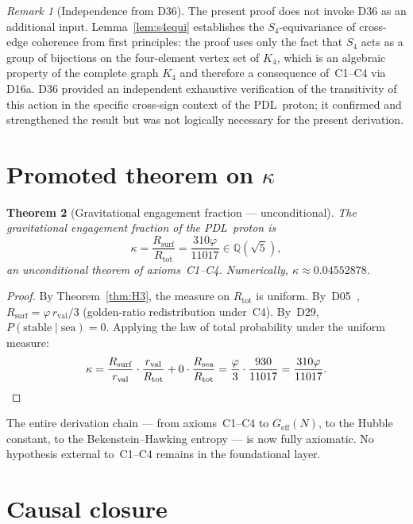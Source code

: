 \documentclass[11pt,a4paper]{article}
\theoremstyle{plain}
\newtheorem{theorem}{Theorem}[section]
\theoremstyle{definition}
\theoremstyle{remark}
\newtheorem{remark}[theorem]{Remark}
\newcommand{\PDL}{\textnormal{PDL}}
\newcommand{\Kfour}{K_4}
\newcommand{\Rtot}{R_{\mathrm{tot}}}
\newcommand{\Rsurf}{R_{\mathrm{surf}}}
\newcommand{\Rsea}{R_{\mathrm{sea}}}
\newcommand{\rval}{r_{\mathrm{val}}}
\newcommand{\vp}{\varphi}
\newcommand{\kap}{\kappa}
\begin{document}
\begin{remark}[Independence from D36]
The present proof does not invoke D36 as an additional input. Lemma~\ref{lem:s4equi} establishes the $S_4$-equivariance of cross-edge coherence from first principles: the proof uses only the fact that $S_4$ acts as a group of bijections on the four-element vertex set of $\Kfour$, which is an algebraic property of the complete graph $K_4$ and therefore a consequence of~C1--C4 via D16a. D36 provided an independent exhaustive verification of the transitivity of this action in the specific cross-sign context of the \PDL\ proton; it confirmed and strengthened the result but was not logically necessary for the present derivation.
\end{remark}

\section{Promoted theorem on \texorpdfstring{$\kap$}{kappa}}
\label{sec:kappa}

\begin{theorem}[Gravitational engagement fraction --- unconditional]
\label{thm:kappa}
The gravitational engagement fraction of the \PDL\ proton is
\[
\kap = \frac{\Rsurf}{\Rtot} = \frac{310\vp}{11017} \in \mathbb{Q}(\sqrt{5}),
\]
an unconditional theorem of axioms~C1--C4. Numerically, $\kap \approx 0.04552878$.
\end{theorem}

\begin{proof}
By Theorem~\ref{thm:H3}, the measure on $\Rtot$ is uniform. By~D05~\cite{PDL_D05_2026}, $\Rsurf = \vp\,\rval/3$ (golden-ratio redistribution under~C4). By~D29, $P(\mathrm{stable}\mid\mathrm{sea}) = 0$. Applying the law of total probability under the uniform measure:
\[
\kap = \frac{\Rsurf}{\rval} \cdot \frac{\rval}{\Rtot} + 0 \cdot \frac{\Rsea}{\Rtot} = \frac{\vp}{3} \cdot \frac{930}{11017} = \frac{310\vp}{11017}. \qedhere
\]
\end{proof}

\noindent The entire derivation chain --- from axioms~C1--C4 to $G_{\mathrm{eff}}(N)$, to the Hubble constant, to the Bekenstein--Hawking entropy --- is now fully axiomatic. No hypothesis external to~C1--C4 remains in the foundational layer.

\section{Causal closure}
\label{sec:causality}
\end{document}
